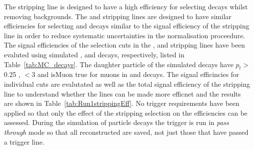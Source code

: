 The \bmumu stripping line is designed to have a high efficiency for selecting \bmumu decays whilst removing backgrounds. The \bhh and \bujpsik stripping lines are designed to have similar efficiencies for selecting \bhh and \bujpsik decays similar to the signal efficiency of the \bmumu stripping line in order to reduce systematic uncertainties in the normalisation proceedure. 
The signal efficiencies of the selection cuts in the \bmumu, \bhh and \bujpsik stripping lines have been evaluted using simulated \bmumu, \bhh and \bujpsik decays, respectively, listed in Table~\ref{tab:MC_decays}. The daughter particle of the simulated decays have $p_t>$0.25 \gevc, \chitrk $<$3 and isMuon true for muons in \bmumu and \bujpsik decays. The signal efficincies for individual cuts are evalutated as well as the total signal efficiency of the stripping line to understand whether the lines can be made more efficnet and the results are shown in Table~\ref{tab:Run1strippingEff}. 
No trigger requirements have been applied so that only the effect of the stripping selection on the efficiencies can be assessed. During the simulation of particle decays the trigger is run in {\it pass through} mode so that all reconstructed are saved, not just those that have passed a trigger line.


